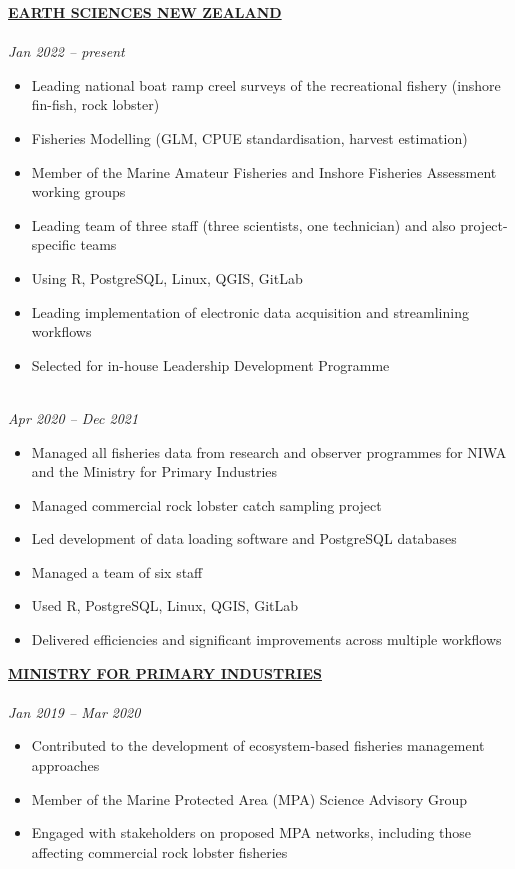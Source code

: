 \documentclass[10pt,a4paper]{article}
\begin{document}
\textbf{\href{https://earthsciences.nz/}{EARTH SCIENCES NEW ZEALAND}}  \\
 \\
\textit{Jan 2022 -- present}
\begin{itemize}[itemsep=2pt, parsep=0pt]
  \item Leading national boat ramp creel surveys of the recreational fishery (inshore fin-fish, rock lobster)
  \item Fisheries Modelling (GLM, CPUE standardisation, harvest estimation)
  \item Member of the Marine Amateur Fisheries and Inshore Fisheries Assessment working groups
  \item Leading team of three staff (three scientists, one technician) and also project-specific teams
  \item Using R, PostgreSQL, Linux, QGIS, GitLab
  \item Leading implementation of electronic data acquisition and streamlining workflows
  \item Selected for in-house Leadership Development Programme
\end{itemize}



\noindent {} \\
\textit{Apr 2020 -- Dec 2021}
\begin{itemize}[itemsep=2pt, parsep=0pt]
  \item Managed all fisheries data from research and observer programmes for NIWA and the Ministry for Primary Industries
  \item Managed commercial rock lobster catch sampling project
  \item Led development of data loading software and PostgreSQL databases
  \item Managed a team of six staff
  \item Used R, PostgreSQL, Linux, QGIS, GitLab
  \item Delivered efficiencies and significant improvements across multiple workflows\\
\end{itemize}



\noindent \textbf{\href{https://www.mpi.govt.nz}{MINISTRY FOR PRIMARY INDUSTRIES}} \\
 \\
\textit{Jan 2019 -- Mar 2020}
\begin{itemize}[itemsep=2pt, parsep=0pt]
  \item Contributed to the development of ecosystem-based fisheries management approaches
  \item Member of the Marine Protected Area (MPA) Science Advisory Group
  \item Engaged with stakeholders on proposed MPA networks, including those affecting commercial rock lobster fisheries\\
\end{itemize}
\end{document}
